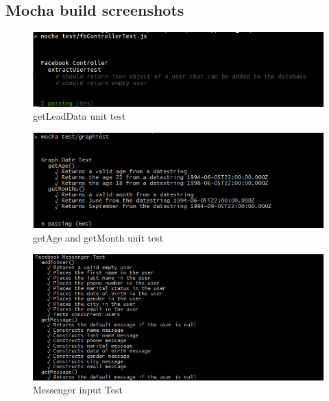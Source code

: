 \documentclass{article}
\begin{document}
	\subsection{Mocha build screenshots}
	
	\begin{figure}[H]
	\includegraphics[width=15cm]{images/FbControllerTest.png}
	\caption{getLeadData unit test}
	\end{figure}
	
	
	\begin{figure}[H]
	\includegraphics[width=15cm]{images/getAge.png}
	\caption{getAge and getMonth unit test}
	\end{figure}
	
	
	\begin{figure}[H]
	\includegraphics[width=15cm]{images/messengerTest.png}
	\caption{Messenger input Test}
	\end{figure}	
	
\end{document}
